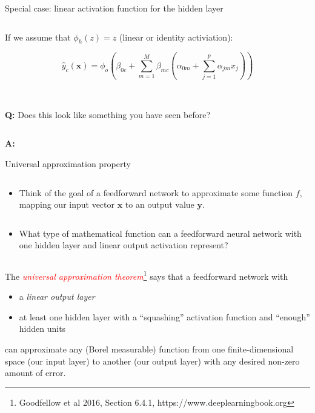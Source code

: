 \documentclass[10pt,ignorenonframetext,]{beamer}
\providecommand{\tightlist}{%
  \setlength{\itemsep}{0pt}\setlength{\parskip}{0pt}}
\begin{document}
\begin{frame}

\begin{block}{Special case: linear activation function for the hidden
layer}

\(~\)

If we assume that \(\phi_h(z)=z\) (linear or identity activiation):

\[
\hat{y}_c({\boldsymbol x})=\phi_o(\beta_{0c}+\sum_{m=1}^M \beta_{mc}(\alpha_{0m}+\sum_{j=1}^p \alpha_{jm}x_{j}))
\]

\(~\) \(~\)

\textbf{Q:} Does this look like something you have seen before?

\(~\)

\textbf{A:}

\end{block}

\end{frame}

\begin{frame}

\begin{block}{Universal approximation property}

\(~\)

\begin{itemize}
\tightlist
\item
  Think of the goal of a feedforward network to approximate some
  function \(f\), mapping our input vector \({\boldsymbol x}\) to an
  output value \({\boldsymbol y}\).
\end{itemize}

\(~\)

\begin{itemize}
\tightlist
\item
  What type of mathematical function can a feedforward neural network
  with one hidden layer and linear output activation represent?
\end{itemize}

\(~\) \pause

The
\emph{\textcolor{red}{universal approximation theorem}}\footnote{Goodfellow et al 2016, Section 6.4.1, https://www.deeplearningbook.org}
says that a feedforward network with \vspace{2mm}

\begin{itemize}
\tightlist
\item
  a \emph{linear output layer}
\item
  at least one hidden layer with a ``squashing'' activation function and
  ``enough'' hidden units
\end{itemize}

\vspace{2mm}

can approximate any (Borel measurable) function from one
finite-dimensional space (our input layer) to another (our output layer)
with any desired non-zero amount of error.

\end{block}

\end{frame}
\end{document}
